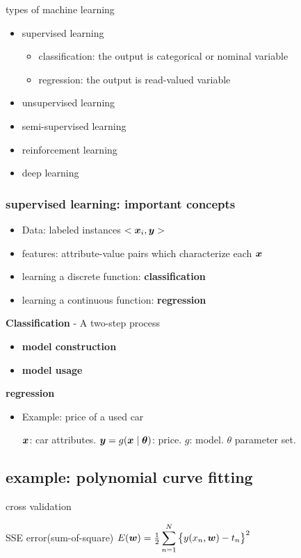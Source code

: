 \documentclass[11pt]{article}
\begin{document}
types of machine learning
\begin{itemize}
\item supervised learning
\begin{itemize}
\item classification: the output is categorical or nominal variable
\item regression: the output is read-valued variable
\end{itemize}
\item unsupervised learning
\item semi-supervised learning
\item reinforcement learning
\item deep learning
\end{itemize}
\subsubsection{supervised learning: important concepts}
\label{sec:orgf704f90}
\begin{itemize}
\item Data: labeled instances \(<\boldsymbol{x}_i,\boldsymbol{y}>\)
\item features: attribute-value pairs which characterize each \(\boldsymbol{x}\)
\item learning a discrete function: \textbf{classification}
\item learning a continuous function: \textbf{regression}
\end{itemize}

\textbf{Classification} - A two-step process
\begin{itemize}
\item \textbf{model construction}
\item \textbf{model usage}
\end{itemize}

\textbf{regression}
\begin{itemize}
\item Example: price of a used car

\(\boldsymbol{x}\): car attributes. \(\boldsymbol{y}=g(\boldsymbol{x}\mid\boldsymbol{\theta})\): price. \(g\):
model. \(\theta\) parameter set.
\end{itemize}
\subsection{example: polynomial curve fitting}
\label{sec:orgb2056a9}
cross validation


SSE error(sum-of-square) \(E(\boldsymbol{w})=\frac{1}{2}\displaystyle\sum_{n=1}^N
   \left\{ y(x_n,\boldsymbol{w})-t_n\right\}^2\)
\end{document}
